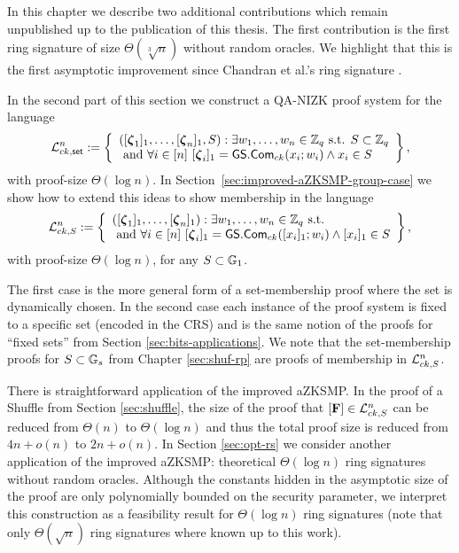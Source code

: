 In this chapter we describe two additional contributions which remain unpublished up to the publication of this thesis. The first contribution is the first ring signature of size $\Theta(\sqrt[3]{n})$ without random oracles. We highlight that this is the first asymptotic improvement since Chandran et al.'s ring signature \cite{ICALP:ChaGroSah07}. 

In the second part of this section we construct a QA-NIZK proof system for the language
\[
\Lang_{ck,\mathsf{set}}^n:=\left\{\begin{array}{l}
([\grkb{\zeta}_1]_1,\ldots,[\grkb{\zeta}_n]_1,S):\exists w_1,\ldots,w_n\in\Z_q \text{ s.t. } S\subset\Z_q\\
\text{ and } \forall i\in [n]\ [\grkb{\zeta}_i]_1=\GS.\Com_{ck}(x_i;w_i)\wedge x_i\in S
\end{array}\right\},
\]
with proof-size $\Theta(\log n)$. In Section~\ref{sec:improved-aZKSMP-group-case} we show how to extend this ideas to show membership in the language
\[
\Lang_{ck,S}^n:=\left\{\begin{array}{l}
([\grkb{\zeta}_1]_1,\ldots,[\grkb{\zeta}_n]_1):\exists w_1,\ldots,w_n\in\Z_q \text{ s.t. } \\
\text{ and } \forall i\in [n]\ [\grkb{\zeta}_i]_1=\GS.\Com_{ck}([x_i]_1;w_i)\wedge [x_i]_1\in S
\end{array}\right\},
\]
with proof-size $\Theta(\log n)$, for any \(S\subset\mathbb{G}_1\).

The first case is the more general form of a set-membership proof where the set is dynamically chosen. In the second case each instance of the proof system is fixed to a specific set (encoded in the CRS) and is the same notion of the proofs for ``fixed sets'' from Section \ref{sec:bits-applications}. We note that the set-membership proofs for $S\subset\mathbb{G}_s$ from Chapter \ref{sec:shuf-rp} are proofs of membership in $\mathcal{L}_{ck,S}^n$.

There is straightforward application of the improved aZKSMP. In the proof of a Shuffle from Section \ref{sec:shuffle}, the size of the proof that $[\mathbf{{F}}]\in\mathcal{L}_{ck,S}^n$ can be reduced from $\Theta(n)$ to $\Theta(\log n)$ and thus the total proof size is reduced from $4n+o(n)$ to $2n+o(n)$. In Section \ref{sec:opt-rs} we consider another application of the improved aZKSMP: theoretical $\Theta(\log n)$ ring signatures without random oracles. Although the constants hidden in the asymptotic size of the proof are only polynomially bounded on the security parameter, we interpret this construction as a feasibility result for $\Theta(\log n)$ ring signatures (note that only $\Theta(\sqrt{n})$ ring signatures where known up to this work).



